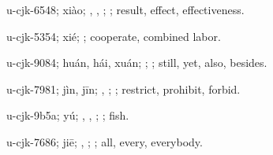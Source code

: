 \begin{multicols}{2}
{\cjkgGlue{}u-cjk-6548; xiào; \cjkgGlue{}\cjkgGlue{}\cjkgGlue{}, \cjkgGlue{}, \cjkgGlue{}\cjkgGlue{}\cjkgGlue{}; \cjkgGlue{}; result, effect, effectiveness.

\cjkgGlue{}u-cjk-5354; xié; \cjkgGlue{}; cooperate, combined labor.

\cjkgGlue{}u-cjk-9084; huán, hái, xuán; \cjkgGlue{}\cjkgGlue{}\cjkgGlue{}; \cjkgGlue{}; still, yet, also, besides.

\cjkgGlue{}u-cjk-7981; jìn, jīn; \cjkgGlue{}, \cjkgGlue{}; \cjkgGlue{}; restrict, prohibit, forbid.

\cjkgGlue{}u-cjk-9b5a; yú; \cjkgGlue{}, \cjkgGlue{}, \cjkgGlue{}; \cjkgGlue{}; fish.

\cjkgGlue{}u-cjk-7686; jiē; \cjkgGlue{}, \cjkgGlue{}; \cjkgGlue{}; all, every, everybody.

}
\end{multicols}
